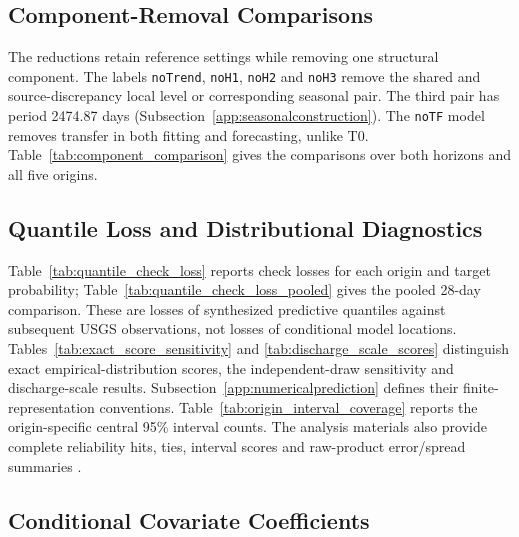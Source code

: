 \subsection{Component-Removal Comparisons}
\label{app:he3ablation}

The reductions retain reference settings while removing one structural component. The labels \texttt{noTrend}, \texttt{noH1}, \texttt{noH2} and \texttt{noH3} remove the shared and source-discrepancy local level or corresponding seasonal pair. The third pair has period 2474.87 days (Subsection~\ref{app:seasonalconstruction}). The \texttt{noTF} model removes transfer in both fitting and forecasting, unlike T0. Table~\ref{tab:component_comparison} gives the comparisons over both horizons and all five origins.



\subsection{Quantile Loss and Distributional Diagnostics}
\label{app:distributionchecks}

Table~\ref{tab:quantile_check_loss} reports check losses for each origin and target probability; Table~\ref{tab:quantile_check_loss_pooled} gives the pooled 28-day comparison. These are losses of synthesized predictive quantiles against subsequent USGS observations, not losses of conditional model locations. Tables~\ref{tab:exact_score_sensitivity} and \ref{tab:discharge_scale_scores} distinguish exact empirical-distribution scores, the independent-draw sensitivity and discharge-scale results. Subsection~\ref{app:numericalprediction} defines their finite-representation conventions. Table~\ref{tab:origin_interval_coverage} reports the origin-specific central 95\% interval counts. The analysis materials also provide complete reliability hits, ties, interval scores and raw-product error/spread summaries \citep{deleon2026sanlorenzo_reproducibility}.






\subsection{Conditional Covariate Coefficients}

